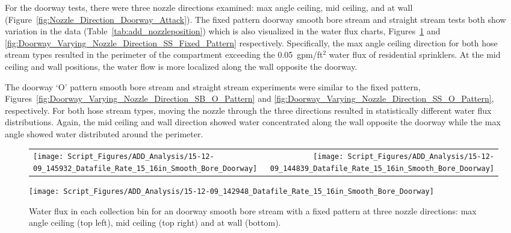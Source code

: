 \documentclass[12pt,oneside]{book}
\begin{document}
For the doorway tests, there were three nozzle directions examined: max angle ceiling, mid ceiling, and at wall (Figure~\ref{fig:Nozzle_Direction_Doorway_Attack}). The fixed pattern doorway smooth bore stream and straight stream tests both show variation in the data (Table~\ref{tab:add_nozzleposition}) which is also visualized in the water flux charts, Figures~\ref{fig:Doorway_Varying_Nozzle_Direction_SB_Fixed_Pattern} and \ref{fig:Doorway_Varying_Nozzle_Direction_SS_Fixed_Pattern} respectively. Specifically, the max angle ceiling direction for both hose stream types resulted in the perimeter of the compartment exceeding the 0.05~gpm/ft$^2$ water flux of residential sprinklers. At the mid ceiling and wall positions, the water flow is more localized along the wall opposite the doorway.

The doorway `O' pattern smooth bore stream and straight stream experiments were similar to the fixed pattern, Figures~\ref{fig:Doorway_Varying_Nozzle_Direction_SB_O_Pattern} and \ref{fig:Doorway_Varying_Nozzle_Direction_SS_O_Pattern}, respectively. For both hose stream types, moving the nozzle through the three directions resulted in statistically different water flux distributions. Again, the mid ceiling and wall direction showed water concentrated along the wall opposite the doorway while the max angle showed water distributed around the perimeter. 

\begin{figure}[ht]
\begin{tabular*}{\textwidth}{lr}
\texttt{[image: Script\_Figures/ADD\_Analysis/15-12-09\_145932\_Datafile\_Rate\_15\_16in\_Smooth\_Bore\_Doorway]} &
\texttt{[image: Script\_Figures/ADD\_Analysis/15-12-09\_144839\_Datafile\_Rate\_15\_16in\_Smooth\_Bore\_Doorway]} \\
\end{tabular*}
\centering
\texttt{[image: Script\_Figures/ADD\_Analysis/15-12-09\_142948\_Datafile\_Rate\_15\_16in\_Smooth\_Bore\_Doorway]}
\caption[Water Flux for Varying Nozzle Direction with Fixed Doorway Smooth Bore Stream]{Water flux in each collection bin for an doorway smooth bore stream with a fixed pattern at three nozzle directions: max angle ceiling (top left), mid ceiling (top right) and at wall (bottom).}
\label{fig:Doorway_Varying_Nozzle_Direction_SB_Fixed_Pattern}
\end{figure}
\end{document}
